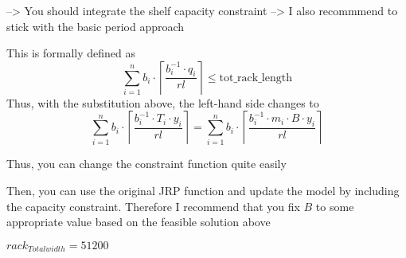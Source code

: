 \documentclass[
]{article}
\newenvironment{Shaded}{\begin{snugshade}}{\end{snugshade}}
\newcommand{\ControlFlowTok}[1]{\textcolor[rgb]{0.13,0.29,0.53}{\textbf{#1}}}
\newcommand{\DataTypeTok}[1]{\textcolor[rgb]{0.13,0.29,0.53}{#1}}
\newcommand{\KeywordTok}[1]{\textcolor[rgb]{0.13,0.29,0.53}{\textbf{#1}}}
\newcommand{\NormalTok}[1]{#1}
\newcommand{\OperatorTok}[1]{\textcolor[rgb]{0.81,0.36,0.00}{\textbf{#1}}}
\newcommand{\StringTok}[1]{\textcolor[rgb]{0.31,0.60,0.02}{#1}}
\begin{document}
--\textgreater{} You should integrate the shelf capacity constraint
--\textgreater{} I also recommmend to stick with the basic period
approach

This is formally defined as
\[ \sum_{i=1}^n b_i \cdot \left\lceil\frac{b^{-1}_i \cdot q_i}{rl} \right \rceil \leq \text{tot_rack_length}\]
Thus, with the substitution above, the left-hand side changes to
\[ \sum_{i=1}^n b_i \cdot \left\lceil\frac{b^{-1}_i \cdot T_i \cdot y_i}{rl} \right \rceil = \sum_{i=1}^n b_i \cdot \left\lceil\frac{b^{-1}_i \cdot m_i \cdot B \cdot y_i}{rl} \right \rceil\]

Thus, you can change the constraint function quite easily

\begin{Shaded}
\end{Shaded}

Then, you can use the original JRP function and update the model by
including the capacity constraint. Therefore I recommend that you fix
\(B\) to some appropriate value based on the feasible solution above

\(rack_{Totalwidth}=51200\)
\end{document}
